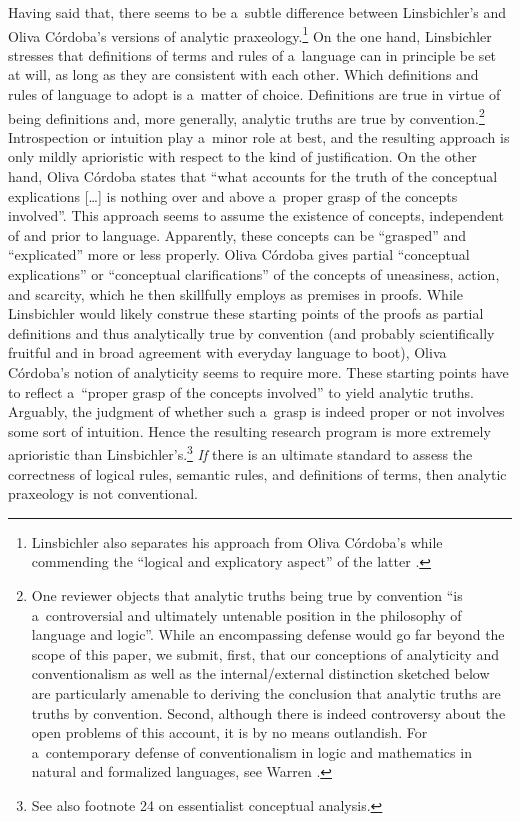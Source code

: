 Having said that, there seems to be a~subtle difference between Linsbichler's and Oliva Córdoba's versions of analytic praxeology.\footnote{Linsbichler also separates his approach from Oliva Córdoba's while commending the ``logical and explicatory aspect'' of the latter 
\parencite[][p.3374]{linsbichler_austrian_2021}.%
} On the one hand, Linsbichler stresses that definitions of terms and rules of a~language can in principle be set at will, as long as they are consistent with each other. Which definitions and rules of language to adopt is a~matter of choice. Definitions are true in virtue of being definitions and, more generally, analytic truths are true by convention.\footnote{One reviewer objects that analytic truths being true by convention ``is a~controversial and ultimately untenable position in the philosophy of language and logic''. While an encompassing defense would go far beyond the scope of this paper, we submit, first, that our conceptions of analyticity and conventionalism as well as the internal/external distinction sketched below are particularly amenable to deriving the conclusion that analytic truths are truths by convention. Second, although there is indeed controversy about the open problems of this account, it is by no means outlandish. For a~contemporary defense of conventionalism in logic and mathematics in natural and formalized languages, see Warren 
\parencite*[][]{warren_shadows_2020}. %
 } Introspection or intuition play a~minor role at best, and the resulting approach is only mildly aprioristic with respect to the kind of justification. On the other hand, Oliva Córdoba 
\parencite*[][p.527]{} %
 states that ``what accounts for the truth of the conceptual explications […] is nothing over and above a~proper grasp of the concepts involved''. This approach seems to assume the existence of concepts, independent of and prior to language. Apparently, these concepts can be ``grasped'' and ``explicated'' more or less properly. Oliva Córdoba 
\parencite*[][]{} %
 gives partial ``conceptual explications'' or ``conceptual clarifications'' of the concepts of uneasiness, action, and scarcity, which he then skillfully employs as premises in proofs. While Linsbichler would likely construe these starting points of the proofs as partial definitions and thus analytically true by convention (and probably scientifically fruitful and in broad agreement with everyday language to boot), Oliva Córdoba's notion of analyticity seems to require more. These starting points have to reflect a~``proper grasp of the concepts involved'' 
\parencite[][p.527]{oliva_cordoba_uneasiness_2017} %
 to yield analytic truths. Arguably, the judgment of whether such a~grasp is indeed proper or not involves some sort of intuition. Hence the resulting research program is more extremely aprioristic than Linsbichler's.\footnote{See also footnote 24 on essentialist conceptual analysis.} \textit{If} there is an ultimate standard to assess the correctness of logical rules, semantic rules, and definitions of terms, then analytic praxeology is not conventional.



